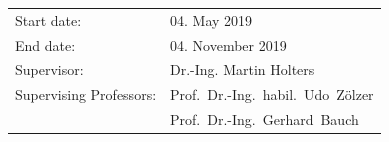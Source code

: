 \begin{titlepage}
\begin{center}
        \vfill
        \begin{tabular}{ll}
            Start date:            & 04. May 2019                       \\
            End date:              & 04. November 2019                   \\
            Supervisor:            & Dr.-Ing. Martin Holters            \\
            Supervising Professors: & Prof.~Dr.-Ing.~habil.~Udo~Z\"olzer \\
                                   & Prof.~Dr.-Ing.~Gerhard~Bauch\\
        \end{tabular}
    \end{center}
    \vspace{2cm}

\end{titlepage}

